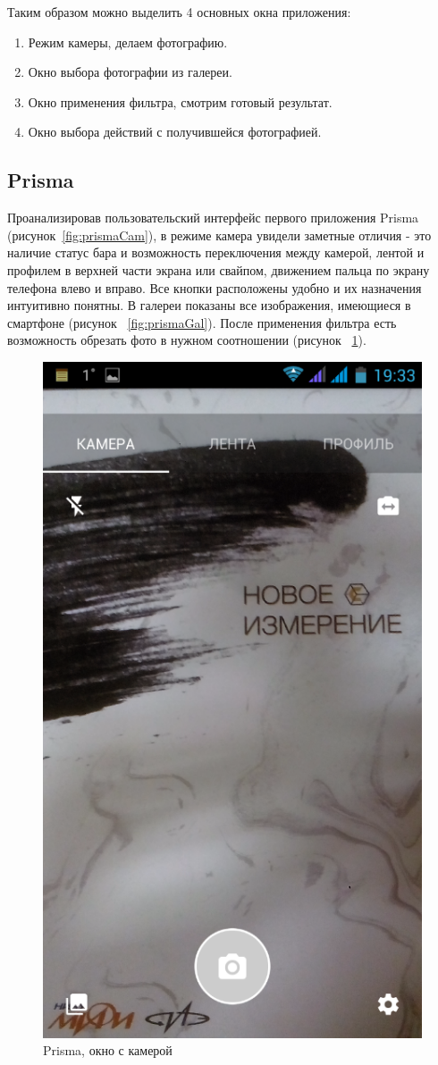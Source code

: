 Таким образом можно выделить 4 основных окна приложения:
\begin{enumerate}
	\item Режим камеры, делаем фотографию.
	\item Окно выбора фотографии из галереи.
	\item Окно применения фильтра, смотрим готовый результат.
	\item Окно выбора действий с получившейся фотографией.
\end{enumerate}

\subsection{Prisma}
Проанализировав пользовательский интерфейс первого приложения Prisma (рисунок~\ref{fig:prismaCam}), в режиме камера увидели заметные отличия - это наличие статус бара и возможность переключения между камерой, лентой и профилем в верхней части экрана или свайпом, движением пальца по экрану телефона влево и вправо. Все кнопки расположены удобно и их назначения интуитивно понятны. В галереи показаны все изображения, имеющиеся в смартфоне (рисунок ~\ref{fig:prismaGal}). После применения фильтра есть возможность обрезать фото в нужном соотношении (рисунок ~\ref{fig:prismaProp}).

\begin{figure}[H]
	\centering
	\includegraphics[width=0.3\linewidth]{pics/prismaCam}
	\caption{Prisma, окно с камерой}
	\label{fig:prismaCam}
	\label{fig:prismaGal}
	\label{fig:prismaProp}
\end{figure}


